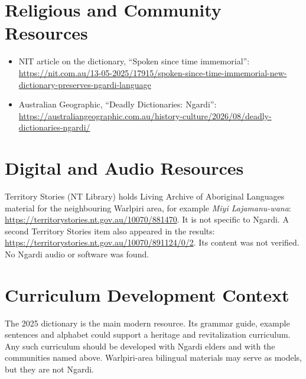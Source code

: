 \documentclass[12pt]{article}
\begin{document}
\section{Religious and Community Resources}
\begin{itemize}
\item NIT article on the dictionary, ``Spoken since time immemorial'': \url{https://nit.com.au/13-05-2025/17915/spoken-since-time-immemorial-new-dictionary-preserves-ngardi-language}
\item Australian Geographic, ``Deadly Dictionaries: Ngardi'': \url{https://australiangeographic.com.au/history-culture/2026/08/deadly-dictionaries-ngardi/}
\end{itemize}

\section{Digital and Audio Resources}
Territory Stories (NT Library) holds Living Archive of Aboriginal Languages material for the neighbouring Warlpiri area, for example \emph{Miyi Lajamanu-wana}: \url{https://territorystories.nt.gov.au/10070/881470}. It is not specific to Ngardi. A second Territory Stories item also appeared in the results: \url{https://territorystories.nt.gov.au/10070/891124/0/2}. Its content was not verified. No Ngardi audio or software was found.

\section{Curriculum Development Context}
The 2025 dictionary is the main modern resource. Its grammar guide, example sentences and alphabet could support a heritage and revitalization curriculum. Any such curriculum should be developed with Ngardi elders and with the communities named above. Warlpiri-area bilingual materials may serve as models, but they are not Ngardi.
\end{document}
